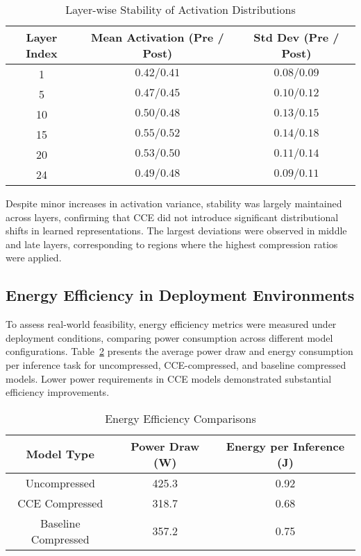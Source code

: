 \documentclass{article}
\begin{document}
\begin{table}[t]
	\centering
	\caption{Layer-wise Stability of Activation Distributions}
	\label{tab:activation_stability}
		\begin{tabular}{ccc}
			\hline
			\textbf{Layer Index} & \textbf{Mean Activation (Pre / Post)} & \textbf{Std Dev (Pre / Post)} \\
			\hline
			1  & $0.42 / 0.41$ & $0.08 / 0.09$ \\
			5  & $0.47 / 0.45$ & $0.10 / 0.12$ \\
			10 & $0.50 / 0.48$ & $0.13 / 0.15$ \\
			15 & $0.55 / 0.52$ & $0.14 / 0.18$ \\
			20 & $0.53 / 0.50$ & $0.11 / 0.14$ \\
			24 & $0.49 / 0.48$ & $0.09 / 0.11$ \\
			\hline
		\end{tabular}%
\end{table}

Despite minor increases in activation variance, stability was largely maintained across layers, confirming that CCE did not introduce significant distributional shifts in learned representations. The largest deviations were observed in middle and late layers, corresponding to regions where the highest compression ratios were applied.

\subsection{Energy Efficiency in Deployment Environments}

To assess real-world feasibility, energy efficiency metrics were measured under deployment conditions, comparing power consumption across different model configurations. Table~\ref{tab:energy_efficiency} presents the average power draw and energy consumption per inference task for uncompressed, CCE-compressed, and baseline compressed models. Lower power requirements in CCE models demonstrated substantial efficiency improvements.

\begin{table}[t]
	\centering
	\caption{Energy Efficiency Comparisons}
	\label{tab:energy_efficiency}
		\begin{tabular}{ccc}
			\hline
			\textbf{Model Type} & \textbf{Power Draw (W)} & \textbf{Energy per Inference (J)} \\
			\hline
			Uncompressed & 425.3 & 0.92 \\
			CCE Compressed & 318.7 & 0.68 \\
			Baseline Compressed & 357.2 & 0.75 \\
			\hline
		\end{tabular}%
\end{table}
\end{document}
